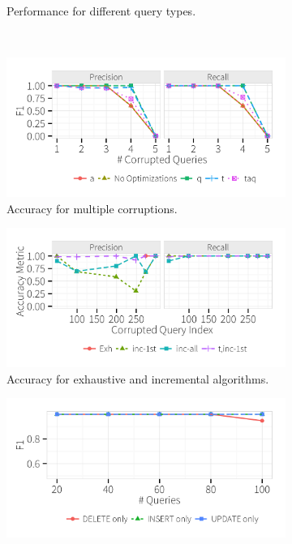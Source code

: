 \begin{figure}[h]
\begin{subfigure}[t]{.3\textwidth}
    \vspace*{-.1in}
    \caption{Performance for different query types.}
    \label{f:indelup_time} 
    \end{subfigure}
    \\
    \begin{subfigure}[t]{.3\textwidth}
    \includegraphics[width = .99\columnwidth]{figures/multi_pr}
    \vspace*{-.1in}
    \caption{Accuracy for multiple corruptions.}
    \label{f:multiquery} 
    \end{subfigure}
    \begin{subfigure}[t]{.3\textwidth}
    \includegraphics[width = .99\columnwidth]{figures/incrementalcompare_acc}
    \vspace*{-.1in}
    \caption{Accuracy for exhaustive and incremental algorithms.}
    \label{f:singlequeryinc_acc} 
    \end{subfigure}
    \begin{subfigure}[t]{.3\textwidth}
    \includegraphics[width = .99\columnwidth]{figures/indelup_acc}

\end{subfigure}
\end{figure}
